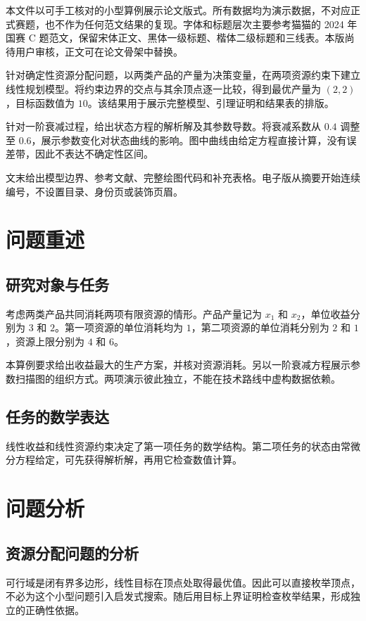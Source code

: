 \documentclass[UTF8,a4paper,zihao=-4,fontset=fandol]{ctexart}
\begin{document}
\begin{modelabstract}
本文件以可手工核对的小型算例展示论文版式。所有数据均为演示数据，不对应正式赛题，也不作为任何范文结果的复现。字体和标题层次主要参考猫猫的 2024 年国赛 C 题范文，保留宋体正文、黑体一级标题、楷体二级标题和三线表。本版尚待用户审核，正文可在论文骨架中替换。

针对确定性资源分配问题，以两类产品的产量为决策变量，在两项资源约束下建立线性规划模型。将约束边界的交点与其余顶点逐一比较，得到最优产量为 $(2,2)$，目标函数值为 $10$。该结果用于展示完整模型、引理证明和结果表的排版。

针对一阶衰减过程，给出状态方程的解析解及其参数导数。将衰减系数从 $0.4$ 调整至 $0.6$，展示参数变化对状态曲线的影响。图中曲线由给定方程直接计算，没有误差带，因此不表达不确定性区间。

文末给出模型边界、参考文献、完整绘图代码和补充表格。电子版从摘要开始连续编号，不设置目录、身份页或装饰页眉。
\end{modelabstract}
\clearpage
\normalsize
\label{mainbody:start}

\section{问题重述}
\subsection{研究对象与任务}
考虑两类产品共同消耗两项有限资源的情形。产品产量记为 $x_1$ 和 $x_2$，单位收益分别为 $3$ 和 $2$。第一项资源的单位消耗均为 $1$，第二项资源的单位消耗分别为 $2$ 和 $1$，资源上限分别为 $4$ 和 $6$。

本算例要求给出收益最大的生产方案，并核对资源消耗。另以一阶衰减方程展示参数扫描图的组织方式。两项演示彼此独立，不能在技术路线中虚构数据依赖。
\subsection{任务的数学表达}
线性收益和线性资源约束决定了第一项任务的数学结构。第二项任务的状态由常微分方程给定，可先获得解析解，再用它检查数值计算。

\section{问题分析}
\subsection{资源分配问题的分析}
可行域是闭有界多边形，线性目标在顶点处取得最优值。因此可以直接枚举顶点，不必为这个小型问题引入启发式搜索。随后用目标上界证明检查枚举结果，形成独立的正确性依据。
\end{document}
